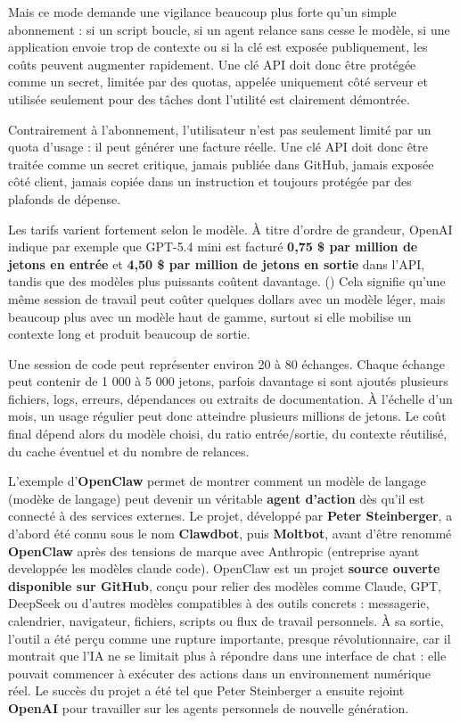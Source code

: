 \documentclass[
  10pt,
  a4paper,
  DIV=11,
  numbers=noendperiod,
  oneside]{scrreprt}
\let\oldtextbf\textbf
\renewcommand{\textbf}[1]{\oldtextbf{\textcolor{cmmnavy}{#1}}}
\begin{document}
Mais ce mode demande une vigilance beaucoup plus forte qu'un simple
abonnement : si un script boucle, si un agent relance sans cesse le
modèle, si une application envoie trop de contexte ou si la clé est
exposée publiquement, les coûts peuvent augmenter rapidement. Une clé
API doit donc être protégée comme un secret, limitée par des quotas,
appelée uniquement côté serveur et utilisée seulement pour des tâches
dont l'utilité est clairement démontrée.

Contrairement à l'abonnement, l'utilisateur n'est pas seulement limité
par un quota d'usage : il peut générer une facture réelle. Une clé API
doit donc être traitée comme un secret critique, jamais publiée dans
GitHub, jamais exposée côté client, jamais copiée dans un instruction et
toujours protégée par des plafonds de dépense.

Les tarifs varient fortement selon le modèle. À titre d'ordre de
grandeur, OpenAI indique par exemple que GPT-5.4 mini est facturé
\textbf{0,75 \$ par million de jetons en entrée} et \textbf{4,50 \$ par
million de jetons en sortie} dans l'API, tandis que des modèles plus
puissants coûtent davantage. () Cela signifie qu'une même session de travail peut coûter
quelques dollars avec un modèle léger, mais beaucoup plus avec un modèle
haut de gamme, surtout si elle mobilise un contexte long et produit
beaucoup de sortie.

Une session de code peut représenter environ 20 à 80 échanges. Chaque
échange peut contenir de 1 000 à 5 000 jetons, parfois davantage si sont
ajoutés plusieurs fichiers, logs, erreurs, dépendances ou extraits de
documentation. À l'échelle d'un mois, un usage régulier peut donc
atteindre plusieurs millions de jetons. Le coût final dépend alors du
modèle choisi, du ratio entrée/sortie, du contexte réutilisé, du cache
éventuel et du nombre de relances.

L'exemple d'\textbf{OpenClaw} permet de montrer comment un modèle de
langage (modèke de langage) peut devenir un véritable \textbf{agent
d'action} dès qu'il est connecté à des services externes. Le projet,
développé par \textbf{Peter Steinberger}, a d'abord été connu sous le
nom \textbf{Clawdbot}, puis \textbf{Moltbot}, avant d'être renommé
\textbf{OpenClaw} après des tensions de marque avec Anthropic
(entreprise ayant developpée les modèles claude code). OpenClaw est un
projet \textbf{source ouverte disponible sur GitHub}, conçu pour relier
des modèles comme Claude, GPT, DeepSeek ou d'autres modèles compatibles
à des outils concrets : messagerie, calendrier, navigateur, fichiers,
scripts ou flux de travail personnels. À sa sortie, l'outil a été perçu
comme une rupture importante, presque révolutionnaire, car il montrait
que l'IA ne se limitait plus à répondre dans une interface de chat :
elle pouvait commencer à exécuter des actions dans un environnement
numérique réel. Le succès du projet a été tel que Peter Steinberger a
ensuite rejoint \textbf{OpenAI} pour travailler sur les agents
personnels de nouvelle génération.
\end{document}
